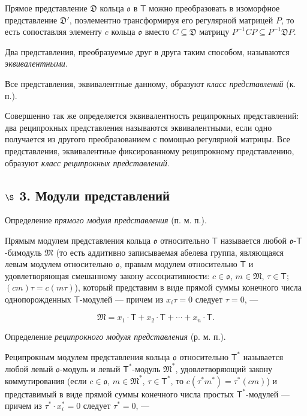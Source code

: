 \documentclass[11pt]{article}
\begin{document}
Прямое представление \(\mathfrak D\) кольца \(\mathfrak{o}\) в \(\mathsf T\) можно преобразовать в изоморфное представление \(\mathfrak D'\), поэлементно трансформируя его регулярной матрицей \(P\), то есть сопоставляя элементу \(c\) кольца \(\mathfrak{o}\) вместо \(C\subseteq\mathfrak D\) матрицу \(P^{-1}CP\subseteq P^{-1}\mathfrak D P\).

Два представления, преобразуемые друг в друга таким способом, называются \emph{эквивалентными}.

Все представления, эквивалентные данному, образуют \emph{класс представлений} (к. п.).

Совершенно так же определяется эквивалентность реципрокных представлений: два реципрокных представления называются эквивалентными, если одно получается из другого преобразованием с помощью регулярной матрицы. Все представления, эквивалентные фиксированному реципрокному представлению, образуют \emph{класс реципрокных представлений}.

\subsection*{\texorpdfstring{\(\S\) 3. Модули представлений}{\textbackslash S 3. Модули представлений}}\label{s-3.-darstellungsmoduln}

Определение \emph{прямого модуля представления} (п. м. п.).

Прямым модулем представления кольца \(\mathfrak{o}\) относительно \(\mathsf T\) называется любой \(\mathfrak{o}\)-\(\mathsf T\)-бимодуль \(\mathfrak M\) (то есть аддитивно записываемая абелева группа, являющаяся левым модулем относительно \(\mathfrak{o}\), правым модулем относительно \(\mathsf T\) и удовлетворяющая смешанному закону ассоциативности: \(c\in\mathfrak{o}\), \(m\in\mathfrak M\), \(\tau\in\mathsf T\); \((cm)\tau=c(m\tau)\)), который представим в виде прямой суммы конечного числа однопорожденных \(\mathsf T\)-модулей --- причем из \(x_i\tau=0\) следует \(\tau=0\), ---

\[
\mathfrak M=x_1\cdot\mathsf T+x_2\cdot\mathsf T+\cdots+x_n\cdot\mathsf T.
\]

Определение \emph{реципрокного модуля представления} (р. м. п.).

Реципрокным модулем представления кольца \(\mathfrak{o}\) относительно \(\mathsf T^*\) называется любой левый \(\mathfrak{o}\)-модуль и левый \(\mathsf T^*\)-модуль \(\mathfrak M^*\), удовлетворяющий закону коммутирования (если \(c\in\mathfrak{o}\), \(m\in\mathfrak M^*\), \(\tau\in\mathsf T^*\), то \(c(\tau^*m^*)=\tau^*(cm)\)) и представимый в виде прямой суммы конечного числа простых \(\mathsf T^*\)-модулей --- причем из \(\tau^*\cdot x_i^*=0\) следует \(\tau^*=0\), ---
\end{document}
